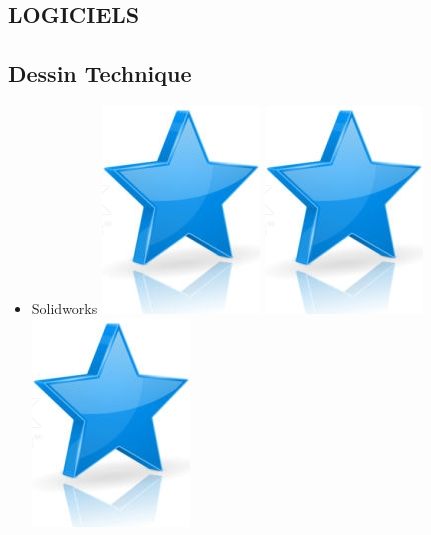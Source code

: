 \documentclass[10pt,a4paper,sans]{article}
\begin{document}
\begin{minipage}[t]{0.28\textwidth}
    \begin{mdframed}[style=cadreCompetences]
        \section{LOGICIELS}
        \subsection{Dessin Technique}
        \begin{itemize}
            \item{Solidworks
                    \hfill
                    \includegraphics[scale=0.20]{img/star.png} \hspace{-0.2cm}
                    \includegraphics[scale=0.20]{img/star.png} \hspace{-0.2cm}
                    \includegraphics[scale=0.20]{img/star.png} \hspace{-0.2cm}
}
\end{itemize}
\end{mdframed}
\end{minipage}
\end{document}
